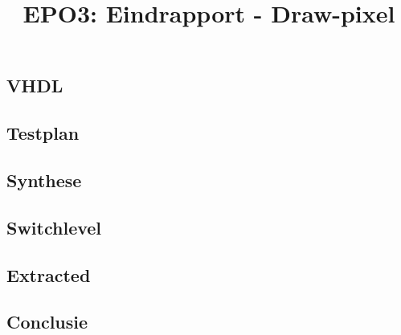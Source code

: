 \documentclass{scrartcl} %
\author{}%
\title{EPO3: Eindrapport - Draw-pixel}
\begin{document}
\section{} %
\label{sec:draw-fill}


\subsection{VHDL}

\subsection{Testplan}

\subsection{Synthese}

\subsection{Switchlevel}

\subsection{Extracted}

\subsection{Conclusie}
\end{document}
